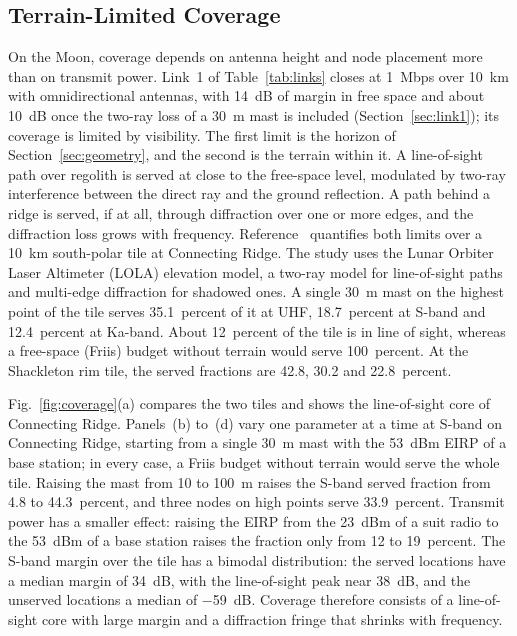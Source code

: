 \documentclass{IEEEoj}
\begin{document}
\subsection{Terrain-Limited Coverage}
\label{sec:coverage}
On the Moon, coverage depends on antenna height and node placement more than on transmit power. Link~1 of Table~\ref{tab:links} closes at \SI{1}{Mbps} over \SI{10}{km} with omnidirectional antennas, with \SI{14}{dB} of margin in free space and about \SI{10}{dB} once the two-ray loss of a \SI{30}{m} mast is included (Section~\ref{sec:link1}); its coverage is limited by visibility. The first limit is the horizon of Section~\ref{sec:geometry}, and the second is the terrain within it. A line-of-sight path over regolith is served at close to the free-space level, modulated by two-ray interference between the direct ray and the ground reflection. A path behind a ridge is served, if at all, through diffraction over one or more edges, and the diffraction loss grows with frequency. Reference~\cite{baena2027surface} quantifies both limits over a \SI{10}{km} south-polar tile at Connecting Ridge. The study uses the Lunar Orbiter Laser Altimeter (LOLA) elevation model, a two-ray model for line-of-sight paths and multi-edge diffraction for shadowed ones. A single \SI{30}{m} mast on the highest point of the tile serves 35.1~percent of it at UHF, 18.7~percent at S-band and 12.4~percent at Ka-band. About 12~percent of the tile is in line of sight, whereas a free-space (Friis) budget without terrain would serve 100~percent. At the Shackleton rim tile, the served fractions are 42.8, 30.2 and 22.8~percent.

Fig.~\ref{fig:coverage}(a) compares the two tiles and shows the line-of-sight core of Connecting Ridge. Panels~(b) to~(d) vary one parameter at a time at S-band on Connecting Ridge, starting from a single \SI{30}{m} mast with the \SI{53}{dBm} EIRP of a base station; in every case, a Friis budget without terrain would serve the whole tile. Raising the mast from 10 to \SI{100}{m} raises the S-band served fraction from 4.8 to 44.3~percent, and three nodes on high points serve 33.9~percent. Transmit power has a smaller effect: raising the EIRP from the \SI{23}{dBm} of a suit radio to the \SI{53}{dBm} of a base station raises the fraction only from 12 to 19~percent. The S-band margin over the tile has a bimodal distribution: the served locations have a median margin of \SI{+34}{dB}, with the line-of-sight peak near \SI{+38}{dB}, and the unserved locations a median of \SI{-59}{dB}. Coverage therefore consists of a line-of-sight core with large margin and a diffraction fringe that shrinks with frequency.
\end{document}
